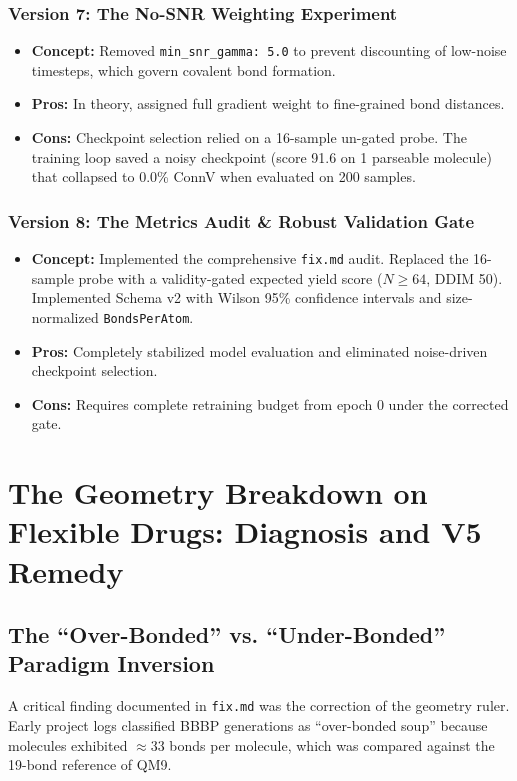 \documentclass[11pt, a4paper]{article}
\begin{document}
\subsubsection{Version 7: The No-SNR Weighting Experiment}
\begin{itemize}[noitemsep]
    \item \textbf{Concept:} Removed \texttt{min\_snr\_gamma: 5.0} to prevent discounting of low-noise timesteps, which govern covalent bond formation.
    \item \textbf{Pros:} In theory, assigned full gradient weight to fine-grained bond distances.
    \item \textbf{Cons:} Checkpoint selection relied on a 16-sample un-gated probe. The training loop saved a noisy checkpoint (score 91.6 on 1 parseable molecule) that collapsed to 0.0\% ConnV when evaluated on 200 samples.
\end{itemize}

\subsubsection{Version 8: The Metrics Audit \& Robust Validation Gate}
\begin{itemize}[noitemsep]
    \item \textbf{Concept:} Implemented the comprehensive \texttt{fix.md} audit. Replaced the 16-sample probe with a validity-gated expected yield score ($N \ge 64$, DDIM 50). Implemented Schema v2 with Wilson 95\% confidence intervals and size-normalized \texttt{BondsPerAtom}.
    \item \textbf{Pros:} Completely stabilized model evaluation and eliminated noise-driven checkpoint selection.
    \item \textbf{Cons:} Requires complete retraining budget from epoch 0 under the corrected gate.
\end{itemize}

\section{The Geometry Breakdown on Flexible Drugs: Diagnosis and V5 Remedy}

\subsection{The ``Over-Bonded'' vs. ``Under-Bonded'' Paradigm Inversion}
A critical finding documented in \texttt{fix.md} was the correction of the geometry ruler. Early project logs classified BBBP generations as ``over-bonded soup'' because molecules exhibited $\approx 33$ bonds per molecule, which was compared against the 19-bond reference of QM9. 
\end{document}
